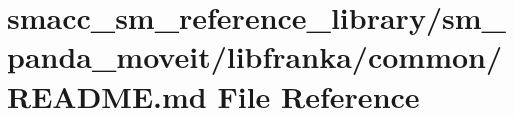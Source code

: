\hypertarget{smacc__sm__reference__library_2sm__panda__moveit_2libfranka_2common_2README_8md}{}\section{smacc\+\_\+sm\+\_\+reference\+\_\+library/sm\+\_\+panda\+\_\+moveit/libfranka/common/\+R\+E\+A\+D\+ME.md File Reference}
\label{smacc__sm__reference__library_2sm__panda__moveit_2libfranka_2common_2README_8md}
